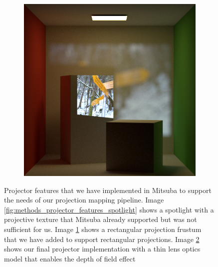 \begin{figure}[]
\begin{subfigure}[b]{0.32\textwidth}
        \caption{}
        \label{fig:methods_projector_features_frustum}
    \end{subfigure}
    \hfill
    \begin{subfigure}[b]{0.32\textwidth}
        \centering
        \includegraphics[width=\textwidth]{images/03-projector_features-thin_lens.jpg}
        \caption{}
        \label{fig:methods_projector_features_thin_lens}
    \end{subfigure}
    \caption{Projector features that we have implemented in Mitsuba to support the needs of our projection mapping pipeline. Image \ref{fig:methods_projector_features_spotlight} shows  a spotlight with a projective texture that Mitsuba already supported but was not sufficient for us. Image \ref{fig:methods_projector_features_frustum} shows a rectangular projection frustum that we have added to support rectangular projections. Image \ref{fig:methods_projector_features_thin_lens} shows our final projector implementation with a thin lens optics model that enables the depth of field effect}
    \label{fig:methods_projector_features}
\end{figure}

